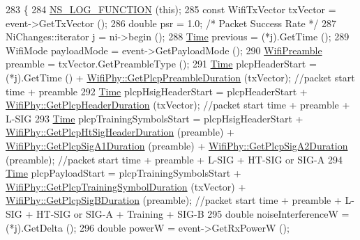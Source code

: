 \begin{DoxyCode}
283 \{
284   \hyperlink{log-macros-disabled_8h_a90b90d5bad1f39cb1b64923ea94c0761}{NS\_LOG\_FUNCTION} (\textcolor{keyword}{this});
285   \textcolor{keyword}{const} WifiTxVector txVector = \textcolor{keyword}{event}->GetTxVector ();
286   \textcolor{keywordtype}{double} psr = 1.0; \textcolor{comment}{/* Packet Success Rate */}
287   NiChanges::iterator j = ni->begin ();
288   \hyperlink{namespacens3_1_1TracedValueCallback_a7ffd3e7c142ffe7c8a1d2db9b8de38ec}{Time} previous = (*j).GetTime ();
289   WifiMode payloadMode = \textcolor{keyword}{event}->GetPayloadMode ();
290   \hyperlink{group__wifi_ga5e94a56cb338a14ffbbb19c6a41251eb}{WifiPreamble} preamble = txVector.GetPreambleType ();
291   \hyperlink{namespacens3_1_1TracedValueCallback_a7ffd3e7c142ffe7c8a1d2db9b8de38ec}{Time} plcpHeaderStart = (*j).GetTime () + \hyperlink{classns3_1_1WifiPhy_a46ecb9d93cc8b2085b70f3e0776cbd6f}{WifiPhy::GetPlcpPreambleDuration}
       (txVector); \textcolor{comment}{//packet start time + preamble}
292   \hyperlink{namespacens3_1_1TracedValueCallback_a7ffd3e7c142ffe7c8a1d2db9b8de38ec}{Time} plcpHsigHeaderStart = plcpHeaderStart + 
      \hyperlink{classns3_1_1WifiPhy_a0f9cfd8f26cb52a1e205391064ceb6ea}{WifiPhy::GetPlcpHeaderDuration} (txVector); \textcolor{comment}{//packet start time + preamble +
       L-SIG}
293   \hyperlink{namespacens3_1_1TracedValueCallback_a7ffd3e7c142ffe7c8a1d2db9b8de38ec}{Time} plcpTrainingSymbolsStart = plcpHsigHeaderStart + 
      \hyperlink{classns3_1_1WifiPhy_a50354c8f71d8f079b9abb137c2216188}{WifiPhy::GetPlcpHtSigHeaderDuration} (preamble) + 
      \hyperlink{classns3_1_1WifiPhy_a545f41e710ce9375848c5728ac9c52a3}{WifiPhy::GetPlcpSigA1Duration} (preamble) + 
      \hyperlink{classns3_1_1WifiPhy_ab134604019ba3d13398f361ee7632f7e}{WifiPhy::GetPlcpSigA2Duration} (preamble); \textcolor{comment}{//packet start time + preamble +
       L-SIG + HT-SIG or SIG-A}
294   \hyperlink{namespacens3_1_1TracedValueCallback_a7ffd3e7c142ffe7c8a1d2db9b8de38ec}{Time} plcpPayloadStart = plcpTrainingSymbolsStart + 
      \hyperlink{classns3_1_1WifiPhy_a5446936c18b66d9fed257a5cd46b25f2}{WifiPhy::GetPlcpTrainingSymbolDuration} (txVector) + 
      \hyperlink{classns3_1_1WifiPhy_ad8021946079254f3143a1656eb8b33f6}{WifiPhy::GetPlcpSigBDuration} (preamble); \textcolor{comment}{//packet start time + preamble + L-SIG
       + HT-SIG or SIG-A + Training + SIG-B}
295   \textcolor{keywordtype}{double} noiseInterferenceW = (*j).GetDelta ();
296   \textcolor{keywordtype}{double} powerW = \textcolor{keyword}{event}->GetRxPowerW ();

\end{DoxyCode}
